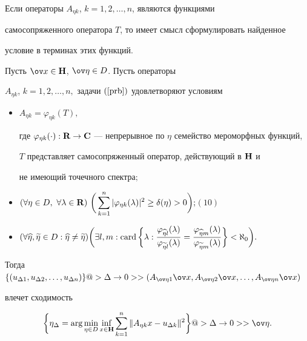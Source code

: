 Если операторы $A_{\eta k}$, $k=1,2,\dotsc, n$, являются функциями


самосопряженного оператора $T$, то имеет смысл сформулировать найденное


условие в терминах этих функций.





\begin{thm}


\label{th4}


Пусть $\ov x\in {\bold H}$, $\ov \eta \in D$. Пусть операторы 


$A_{\eta k}$, $k=1,2,\dotsc, n,$ задачи $(\ref{prb})$ удовлетворяют условиям


\begin{itemize}


\item[1)] $A_{\eta k}=\varphi_{\eta k}(T),$


где $\varphi_{\eta k}(\cdot ):{\bold R


}\to {\bold C }$ --- непрерывное по $\eta $ семейство мероморфных функций,


$T$ представляет самосопряженный оператор, действующий в ${\bold H }$ и


не имеющий точечного спектра$;$


\item[2)] $( \forall \eta \in D,\ \forall \lambda 


\in {\bold R})\ \displaystyle{\bigg(\sum_{k=1}^n|\varphi_{\eta k}(\lambda)


|^2\geq \delta (\eta )>0\bigg);}$\hfill $(10)$


\item[3)] $( \forall \widehat \eta,\widetilde \eta \in D:\widehat \eta \neq


\widetilde \eta )\displaystyle{\bigg (


\exists l,m: \card \bigg\{ \lambda : \frac{


\varphi_{\widehat{\eta }l}(\lambda )}{\varphi_{\widetilde{\eta }l}(\lambda


)}=\frac{\varphi_{\widehat{\eta }m}(\lambda )}{\varphi_{\widetilde{\eta }%


m}(\lambda )}\bigg\} <\aleph_0\bigg).}$


\end{itemize}


Тогда $\{ (u_{\Delta 1},u_{\Delta 2},\dotsc, u_{\Delta


n})\} @>{\Delta \to 0}>>( A_{\ov


\eta 1}\ov x,A_{\ov \eta 2}\ov x,\dotsc, A_{\ov \eta n}\ov x) $


влечет сходимость 


$$


\bigg\{ \eta_\Delta =\arg \min_{\eta \in D}\inf_{x\in {\bold H}%


}\sum_{k=1}^n\| A_{\eta k}x-u_{\Delta k}\|^2\bigg\}


@>{\Delta \to 0}>> \ov \eta.


$$


\end{thm}


